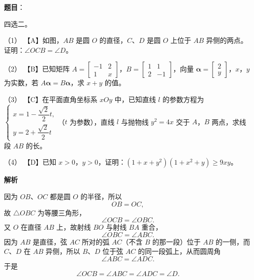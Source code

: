 \begin{answer}

\textbf{题目}：

四选二。

（1） 【A】如图，$AB$ 是圆 $O$ 的直径，$C$、$D$ 是圆 $O$ 上位于 $AB$ 异侧的两点。证明：$\angle OCB=\angle D$。
\nopagebreak[4]
\begin{center}\end{center}
\nopagebreak[4]
（2） 【B】已知矩阵 $A=\begin{bmatrix}-1&2\\1&x\end{bmatrix}$，$B=\begin{bmatrix}1&1\\2&-1\end{bmatrix}$，向量 $\boldsymbol\alpha=\begin{bmatrix}2\\y\end{bmatrix}$，$x$，$y$ 为实数，若 $A\boldsymbol\alpha=B\boldsymbol\alpha$，求 $x+y$ 的值。

（3） 【C】在平面直角坐标系 $xOy$ 中，已知直线 $l$ 的参数方程为 $\begin{cases}x=1-\dfrac{\sqrt2}{2}t,\\y=2+\dfrac{\sqrt2}{2}t\end{cases}$（$t$ 为参数），直线 $l$ 与抛物线 $y^2=4x$ 交于 $A$，$B$ 两点，求线段 $AB$ 的长。

（4） 【D】已知 $x>0$，$y>0$，证明：$(1+x+y^2)(1+x^2+y)\geqslant 9xy$。

\textbf{解析}


因为 $OB$、$OC$ 都是圆 $O$ 的半径，所以
\nopagebreak[4]
\[OB=OC,\]
故 $\triangle OBC$ 为等腰三角形，
\nopagebreak[4]
\[\angle OCB=\angle OBC.\]
又 $O$ 在直径 $AB$ 上，故射线 $BO$ 与射线 $BA$ 重合，
\nopagebreak[4]
\[\angle OBC=\angle ABC.\]
因为 $AB$ 是直径，弦 $AC$ 所对的弧 $AC$（不含 $B$ 的那一段）位于 $AB$ 的一侧，而 $C$、$D$ 在 $AB$ 异侧，所以 $B$、$D$ 位于弦 $AC$ 的同一段弧上，从而圆周角
\nopagebreak[4]
\[\angle ABC=\angle ADC.\]
于是
\nopagebreak[4]
\[\angle OCB=\angle ABC=\angle ADC=\angle D.\]



\end{answer}
